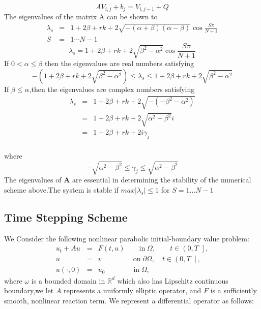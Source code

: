 \documentclass[12pt]{article}
\numberwithin{equation}{section} %
\begin{document}
 \begin{equation*}
 AV_{i,j} + b_{j}=V_{i,j-1}+Q
 \end{equation*}
The eigenvalues of the matrix A can be shown to
%
%
\begin{equation*}
\begin{array}{lcl} \lambda_{s} & = &1+2\beta+rk+2\sqrt{-(\alpha+\beta)(\alpha-\beta)}\cos\frac{S\pi}{N+1}  \\ S & = & 1\cdots N-1 \end{array}
\end{equation*}
\begin{equation*}
\lambda_s=1+2\beta+rk+2\sqrt{\beta^2-\alpha^2}\cos\frac{S\pi}{N+1}
\end{equation*}
If $0<\alpha \leq \beta$ then the eigenvalues are real numbers
satisfying
\begin{equation*}
-(1+2\beta+rk+2\sqrt{\beta^2-\alpha^2})\leq \lambda_s \leq
1+2\beta+rk+2\sqrt{\beta^2-\alpha^2}
\end{equation*}
If $\beta \leq \alpha$,then the eigenvalues are complex numbers
satisfying
\begin{equation*}
\begin{array}{cccllllc}

\lambda_s&=&1+2\beta+rk+2\sqrt{-(-\beta^2-\alpha^2)}\\
&=&1+2\beta+rk+2\sqrt{\alpha^2-\beta^2}i\\
&=&1+2\beta+rk+2i\gamma_j\\
\end{array}
\end{equation*}

where
\begin{equation*}
-\sqrt{\alpha^2-\beta^2}\leq \gamma_j\leq\sqrt{\alpha^2-\beta^2}
\end{equation*}
The eigenvalues of \textbf{A} are essential in determining the
stability of the numerical scheme above.The system is stable if
$max|\lambda_s | \leq 1$ for $S=1...N-1$
\subsection{Time Stepping Scheme}
We Consider the following nonlinear parabolic
initial-boundary value problem:
\begin{eqnarray}\label{tms1}
u_t + A u &=& F(t,u) \qquad \textrm {in} \; \Omega,\qquad t \in \left( 0,T \,\, \right], \label{Eq1}\\
u &=& v \qquad \qquad \; \, \textrm {on} \;\partial \Omega,\quad t \in \left( 0,T \,\, \right], \nonumber \\
u(\cdot,0) &=& u_0 \qquad \qquad \textrm {in} \;\Omega, \nonumber
\end{eqnarray}
where $\omega$ is a bounded domain in $\mathbb{R}^{d}$ which also
has Lipschitz continuous boundary,we let $A$ represents a uniformly
elliptic operator, and $F$ is a sufficiently smooth, nonlinear
reaction term. We represent a differential operator as follows:
\end{document}
